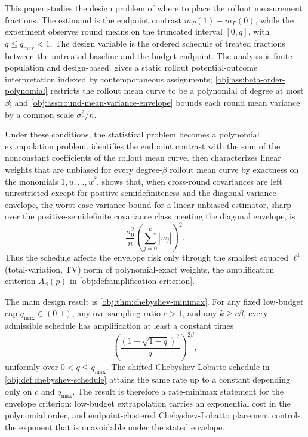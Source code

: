 \documentclass[11pt]{article}
\begin{document}
This paper studies the design problem of where to place the rollout measurement fractions. The estimand is the endpoint contrast \(m_P(1)-m_P(0)\), while the experiment observes round means on the truncated interval \([0,q]\), with \(q\le q_{\max}<1\). The design variable is the ordered schedule of treated fractions between the untreated baseline and the budget endpoint. The analysis is finite-population and design-based.  gives a static rollout potential-outcome interpretation indexed by contemporaneous assignments; \cref{obj:ass:beta-order-polynomial} restricts the rollout mean curve to be a polynomial of degree at most \(\beta\); and \cref{obj:ass:round-mean-variance-envelope} bounds each round mean variance by a common scale \(\sigma_0^2/n\).

Under these conditions, the statistical problem becomes a polynomial extrapolation problem.  identifies the endpoint contrast with the sum of the nonconstant coefficients of the rollout mean curve.  then characterizes linear weights that are unbiased for every degree-\(\beta\) rollout mean curve by exactness on the monomials \(1,u,\ldots,u^\beta\).  shows that, when cross-round covariances are left unrestricted except for positive semidefiniteness and the diagonal variance envelope, the worst-case variance bound for a linear unbiased estimator, sharp over the positive-semidefinite covariance class meeting the diagonal envelope, is
\[
\frac{\sigma_0^2}{n}\left(\sum_{j=0}^k |w_j|\right)^2.
\]
Thus the schedule affects the envelope risk only through the smallest squared \(\ell^1\) (total-variation, TV) norm of polynomial-exact weights, the amplification criterion \(A_\beta(p)\) in \cref{obj:def:amplification-criterion}.

The main design result is \cref{obj:thm:chebyshev-minimax}. For any fixed low-budget cap \(q_{\max}\in(0,1)\), any oversampling ratio \(c>1\), and any \(k\ge c\beta\), every admissible schedule has amplification at least a constant times
\[
\left(\frac{(1+\sqrt{1-q})^2}{q}\right)^{2\beta},
\]
uniformly over \(0<q\le q_{\max}\). The shifted Chebyshev-Lobatto schedule in \cref{obj:def:chebyshev-schedule} attains the same rate up to a constant depending only on \(c\) and \(q_{\max}\). The result is therefore a rate-minimax statement for the envelope criterion: low-budget extrapolation carries an exponential cost in the polynomial order, and endpoint-clustered Chebyshev-Lobatto placement controls the exponent that is unavoidable under the stated envelope.
\end{document}
